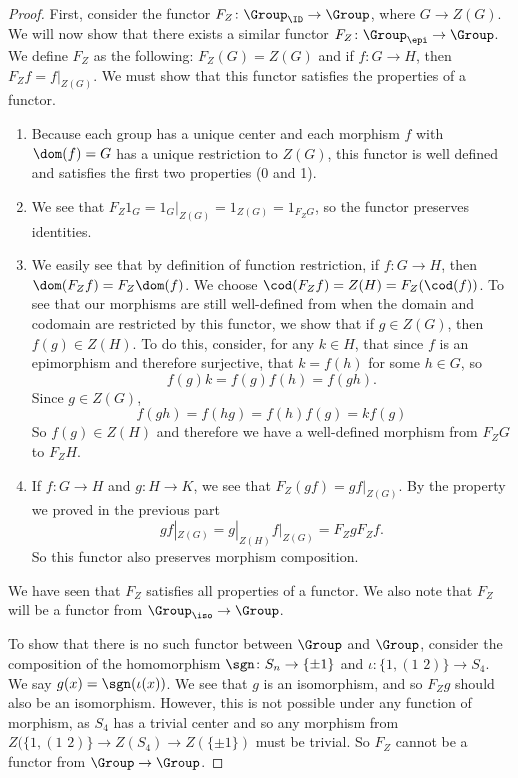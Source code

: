 \documentclass[main.tex]{subfiles}
\begin{document}
\begin{proof}

First, consider the functor $F_Z\colon \Group_{\ID}\rightarrow \Group$, where $G \rightarrow Z(G)$. We will now show that there exists a similar functor $F_Z\colon \Group_{\epi} \rightarrow \Group$. We define $F_Z$ as the following: $F_Z(G) = Z(G)$ and if $f\colon G \rightarrow H$, then $F_{Z} f = f|_{Z(G)}$. We must show that this functor satisfies the properties of a functor.
\begin{enumerate}
	\item Because each group has a unique center and each morphism $f$ with
		$\dom(f) = G$ has a unique restriction to $Z(G)$, this functor is well
		defined and satisfies the first two properties (0 and 1).
	\item We see that $F_{Z} 1_{G} = 1_{G}|_{Z(G)} = 1_{Z(G)} = 1_{F_{Z}G}$, so
		the functor preserves identities.
	\item We easily see that by definition of function restriction, if $f\colon
		G \rightarrow H$, then $\dom(F_{Z}f) = F_{Z}\dom(f)$. We choose
		$\cod(F_{Z}f) = Z(H) = F_Z(\cod(f))$. To see that our morphisms are
		still well-defined from when the domain and codomain are restricted by
		this functor, we show that if $g \in Z(G)$, then $f(g) \in Z(H)$. To do
		this, consider, for any $k \in H$, that since $f$ is an epimorphism and
		therefore surjective, that $k = f(h)$ for some $h \in G$, so
		\[f(g)k = f(g)f(h) = f(gh).\] Since $g \in Z(G)$,
		\[f(gh) = f(hg) = f(h)f(g) = kf(g)\]
		So $f(g) \in Z(H)$ and therefore we have a well-defined morphism
		from $F_ZG$ to $F_ZH$.
	\item If $f\colon G \rightarrow H$ and $g\colon H \rightarrow K$, we see
		that $F_Z(gf) = gf|_{Z(G)}$. By the property we proved in the previous
		part \[gf|_{Z(G)} = g|_{Z(H)}f|_{Z(G)} = F_ZgF_Zf.\] So this functor
		also preserves morphism composition.
\end{enumerate}

We have seen that $F_Z$ satisfies all properties of a functor. We also note that
$F_Z$ will be a functor from $\Group_{\iso} \rightarrow \Group$.

To show that there is no such functor between $\Group$ and $\Group$, consider the
composition of the homomorphism $\sgn\colon S_n \rightarrow \{ \pm 1 \} $ and
$\iota\colon \{1, (1 \,\, 2) \} \rightarrow S_4$. We say $ g(x) =
\sgn(\iota(x))$. We see that $g$ is an isomorphism, and so $F_Zg$ should also be
an isomorphism. However, this is not possible under any function of morphism, as
$S_4$ has a trivial center and so any morphism from $Z(\{1, (1\,\,2)\}
\rightarrow Z(S_4) \rightarrow Z(\{\pm 1\})$ must be trivial. So $F_Z$ cannot be
a functor from $\Group \rightarrow \Group$.


\end{proof}
\end{document}
